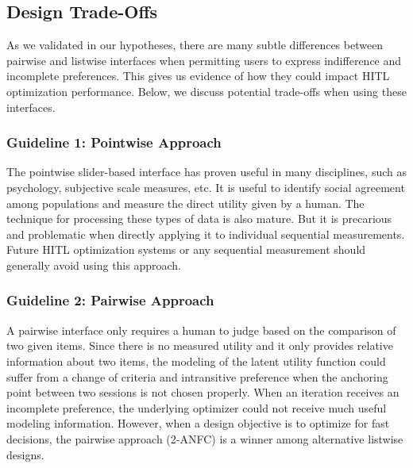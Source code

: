 \documentclass[acmsmall,screen,nonacm]{acmart}
\begin{document}
\subsection{Design Trade-Offs}
As we validated in our hypotheses, there are many subtle differences between pairwise and listwise interfaces when permitting users to express indifference and incomplete preferences. This gives us evidence of how they could impact HITL optimization performance. Below, we discuss potential trade-offs when using these interfaces.
\subsubsection{Guideline 1: Pointwise Approach}
The pointwise slider-based interface has proven useful in many disciplines, such as psychology, subjective scale measures, etc. It is useful to identify social agreement among populations and measure the direct utility given by a human. The technique for processing these types of data is also mature. But it is precarious and problematic when directly applying it to individual sequential measurements. Future HITL optimization systems or any sequential measurement should generally avoid using this approach.
\subsubsection{Guideline 2: Pairwise Approach}
A pairwise interface only requires a human to judge based on the comparison of two given items. Since there is no measured utility and it only provides relative information about two items, the modeling of the latent utility function could suffer from a change of criteria and intransitive preference when the anchoring point between two sessions is not chosen properly.
%
When an iteration receives an incomplete preference, the underlying optimizer could not receive much useful modeling information.
%
However, when a design objective is to optimize for fast decisions, the pairwise approach (2-ANFC) is a winner among alternative listwise designs.
\end{document}
